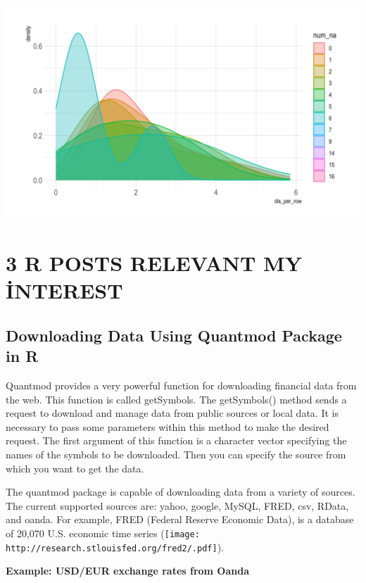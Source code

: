\documentclass[
  letterpaper,
  DIV=11,
  numbers=noendperiod]{scrreprt}
\begin{document}
\includegraphics{./housevotes_density.png}\\


\hypertarget{r-posts-relevant-my-interest}{%
\chapter{3 R POSTS RELEVANT MY
İNTEREST}\label{r-posts-relevant-my-interest}}

\hypertarget{downloading-data-using-quantmod-package-in-r}{%
\section{Downloading Data Using Quantmod Package in
R}\label{downloading-data-using-quantmod-package-in-r}}

Quantmod provides a very powerful function for downloading financial
data from the web. This function is called getSymbols. The getSymbols()
method sends a request to download and manage data from public sources
or local data. It is necessary to pass some parameters within this
method to make the desired request. The first argument of this function
is a character vector specifying the names of the symbols to be
downloaded. Then you can specify the source from which you want to get
the data.

The quantmod package is capable of downloading data from a variety of
sources. The current supported sources are: yahoo, google, MySQL, FRED,
csv, RData, and oanda. For example, FRED (Federal Reserve Economic
Data), is a database of 20,070 U.S. economic time series
(\texttt{[image: http://research.stlouisfed.org/fred2/.pdf]}).

\textbf{Example: USD/EUR exchange rates from Oanda}
\end{document}
